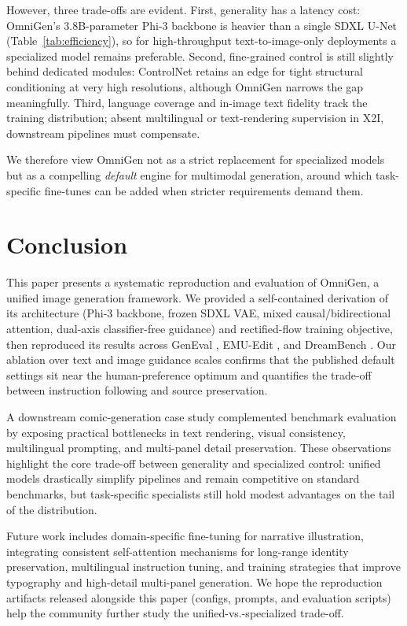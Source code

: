 \documentclass[conference]{IEEEtran}
\begin{document}
However, three trade-offs are evident. First, generality has a latency cost: OmniGen's 3.8B-parameter Phi-3 backbone is heavier than a single SDXL U-Net (Table~\ref{tab:efficiency}), so for high-throughput text-to-image-only deployments a specialized model remains preferable. Second, fine-grained control is still slightly behind dedicated modules: ControlNet \cite{controlnet} retains an edge for tight structural conditioning at very high resolutions, although OmniGen narrows the gap meaningfully. Third, language coverage and in-image text fidelity track the training distribution; absent multilingual or text-rendering supervision in X2I, downstream pipelines must compensate.

We therefore view OmniGen not as a strict replacement for specialized models but as a compelling \emph{default} engine for multimodal generation, around which task-specific fine-tunes can be added when stricter requirements demand them.

\section{Conclusion}
\label{sec:conclusion}
This paper presents a systematic reproduction and evaluation of OmniGen, a unified image generation framework. We provided a self-contained derivation of its architecture (Phi-3 backbone, frozen SDXL VAE, mixed causal/bidirectional attention, dual-axis classifier-free guidance) and rectified-flow training objective, then reproduced its results across GenEval \cite{geneval}, EMU-Edit \cite{emuedit}, and DreamBench \cite{dreambench}. Our ablation over text and image guidance scales confirms that the published default settings sit near the human-preference optimum and quantifies the trade-off between instruction following and source preservation.

A downstream comic-generation case study complemented benchmark evaluation by exposing practical bottlenecks in text rendering, visual consistency, multilingual prompting, and multi-panel detail preservation. These observations highlight the core trade-off between generality and specialized control: unified models drastically simplify pipelines and remain competitive on standard benchmarks, but task-specific specialists still hold modest advantages on the tail of the distribution.

Future work includes domain-specific fine-tuning for narrative illustration, integrating consistent self-attention mechanisms \cite{storydiffusion} for long-range identity preservation, multilingual instruction tuning, and training strategies that improve typography and high-detail multi-panel generation. We hope the reproduction artifacts released alongside this paper (configs, prompts, and evaluation scripts) help the community further study the unified-vs.-specialized trade-off.

\nocite{omnigen2024}



\end{document}
